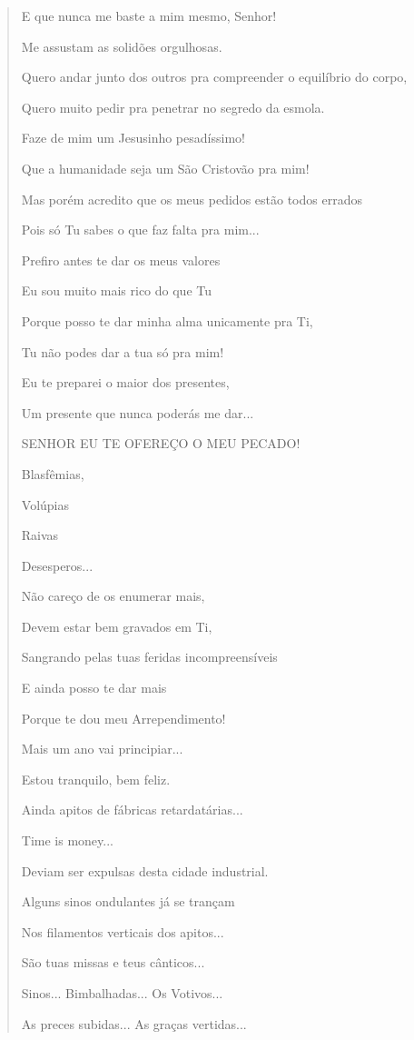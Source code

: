 \begin{verse}
E que nunca me baste a mim mesmo, Senhor!

Me assustam as solidões orgulhosas.

Quero andar junto dos outros pra compreender o equilíbrio do corpo,

Quero muito pedir pra penetrar no segredo da esmola.

Faze de mim um Jesusinho pesadíssimo!

Que a humanidade seja um São Cristovão pra mim!

Mas porém acredito que os meus pedidos estão todos errados

Pois só Tu sabes o que faz falta pra mim...

Prefiro antes te dar os meus valores

Eu sou muito mais rico do que Tu

Porque posso te dar minha alma unicamente pra Ti,

Tu não podes dar a tua só pra mim!

Eu te preparei o maior dos presentes,

Um presente que nunca poderás me dar...

SENHOR EU TE OFEREÇO O MEU PECADO!

Blasfêmias,

Volúpias

Raivas

Desesperos...

Não careço de os enumerar mais,

Devem estar bem gravados em Ti,

Sangrando pelas tuas feridas incompreensíveis

E ainda posso te dar mais

Porque te dou meu Arrependimento!

Mais um ano vai principiar...

Estou tranquilo, bem feliz.

Ainda apitos de fábricas retardatárias...

Time is money...

Deviam ser expulsas desta cidade industrial.

Alguns sinos ondulantes já se trançam

Nos filamentos verticais dos apitos...

São tuas missas e teus cânticos...

Sinos... Bimbalhadas... Os Votivos...

As preces subidas... As graças vertidas...


\end{verse}
